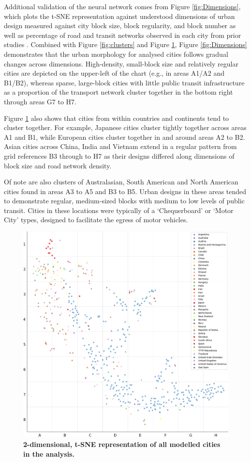 \documentclass[preprint,12pt]{elsarticle}
\begin{document}
Additional validation of the neural network comes from Figure \ref{fig:Dimensions}, which plots the t-SNE representation against understood dimensions of urban design measured against city block size, block regularity, and block number as well as percentage of road and transit networks observed in each city from prior studies \cite{Thompson2020}. Combined with Figure \ref{fig:clusters} and Figure \ref{fig:tSNE}, Figure \ref{fig:Dimensions} demonstrates that the urban morphology for analysed cities follows gradual changes across dimensions. High-density, small-block size and relatively regular cities are depicted on the upper-left of the chart (e.g., in areas A1/A2 and B1/B2), whereas sparse, large-block cities with little public transit infrastructure as a proportion of the transport network cluster together in the bottom right through areas G7 to H7. 

Figure \ref{fig:tSNE} also shows that cities from within countries and continents tend to cluster together. For example, Japanese cities cluster tightly together across areas A1 and B1, while European cities cluster together in and around areas A2 to B2. Asian cities across China, India and Vietnam extend in a regular pattern from grid references B3 through to H7 as their designs differed along dimensions of block size and road network density.

Of note are also clusters of Australasian, South American and North American cities found in areas A3 to A5 and B3 to B5. Urban designs in these areas tended to demonstrate regular, medium-sized blocks with medium to low levels of public transit. Cities in these locations were typically of a `Chequerboard' or `Motor City' types, designed to facilitate the egress of motor vehicles.

\begin{figure}
\centering
\includegraphics[trim={ 0 0 0 0 },clip,scale=0.45]{Images/tSNE Country.png}
\caption{\bf 2-dimensional, t-SNE representation of all modelled cities in the analysis.}
 \label{fig:tSNE}
\end{figure}
\end{document}
